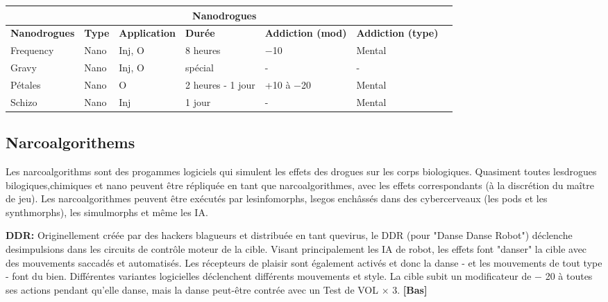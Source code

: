 \hspace{1cm} 

\begin{tabular}{|l|l|l|l|l|l|l|} \hline

\multicolumn{6}{|c|}{\textbf{Nanodrogues}}	\\ \hline

\textbf{Nanodrogues}	&\textbf{Type}	&\textbf{Application}	&\textbf{Durée}	&\textbf{Addiction (mod)}	&\textbf{Addiction (type)} \\ \hline

Frequency	&Nano	&Inj, O	&8 heures &$-$10	&Mental \\ \hline

Gravy	&Nano	&Inj, O	&spécial &- &- \\ \hline

Pétales	&Nano	&O	&2 heures - 1 jour	&+10 à $-$20	&Mental \\ \hline

Schizo	&Nano	&Inj	&1 jour	&- &Mental \\ \hline

\end{tabular} \label{tab:nanodrugs} 

\subsection{Narcoalgorithems} \label{sec:narcoalgorithms} 

Les narcoalgorithms sont des progammes logiciels qui simulent les effets des drogues sur les corps biologiques. Quasiment toutes lesdrogues bilogiques,chimiques et nano peuvent être répliquée en tant que narcoalgorithmes, avec les effets correspondants (à la discrétion du maître de jeu). Les narcoalgorithmes peuvent être exécutés par lesinfomorphs, lsegos enchâssés dans des cybercerveaux (les pods et les synthmorphs), les simulmorphs et même les IA. 

\textbf{DDR:} Originellement créée par des hackers blagueurs et distribuée en tant quevirus, le DDR (pour "Danse Danse Robot") déclenche desimpulsions dans les circuits de contrôle moteur de la cible. Visant principalement les IA de robot, les effets font "danser" la cible avec des mouvements saccadés et automatisés. Les récepteurs de plaisir sont également activés et donc la danse - et les mouvements de tout type - font du bien. Différentes variantes logicielles déclenchent différents mouvements et style. La cible subit un modificateur de $-$ 20 à toutes ses actions pendant qu'elle danse, mais la danse peut-être contrée avec un Test de VOL $\times$ 3. \textbf{[Bas]} 

